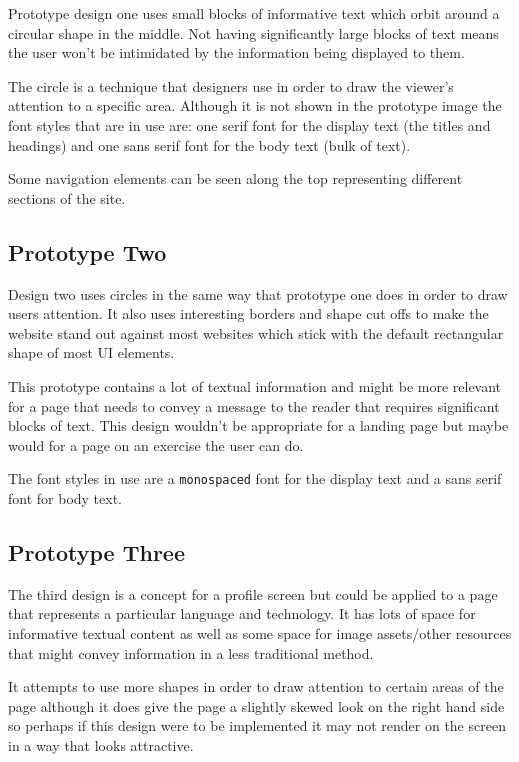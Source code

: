 Prototype design one uses small blocks of informative text which orbit around a circular shape in the middle. Not having significantly large blocks of text means the user won't be intimidated by the information being displayed to them.

The circle is a technique that designers use in order to draw the viewer's attention to a specific area. Although it is not shown in the prototype image the font styles that are in use are: one serif font for the display text (the titles and headings) and one sans serif font for the body text (bulk of text).

Some navigation elements can be seen along the top representing different sections of the site.

\subsection{Prototype Two}

Design two uses circles in the same way that prototype one does in order to draw users attention. It also uses interesting borders and shape cut offs to make the website stand out against most websites which stick with the default rectangular shape of most UI elements.

This prototype contains a lot of textual information and might be more relevant for a page that needs to convey a message to the reader that requires significant blocks of text. This design wouldn't be appropriate for a landing page but maybe would for a page on an exercise the user can do.

The font styles in use are a \texttt{monospaced} font for the display text and a sans serif font for body text.

\subsection{Prototype Three}

The third design is a concept for a profile screen but could be applied to a page that represents a particular language and technology. It has lots of space for informative textual content as well as some space for image assets/other resources that might convey information in a less traditional method.

It attempts to use more shapes in order to draw attention to certain areas of the page although it does give the page a slightly skewed look on the right hand side so perhaps if this design were to be implemented it may not render on the screen in a way that looks attractive.

